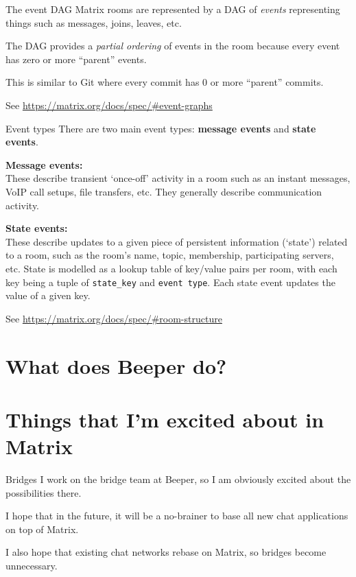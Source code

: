 \documentclass{acm}
\begin{document}
\begin{frame}{The event DAG}
    Matrix rooms are represented by a DAG of \textit{events} representing things
    such as messages, joins, leaves, etc.
    \pause

    The DAG provides a \textit{partial ordering} of events in the room because
    every event has zero or more ``parent'' events.
    \pause

    This is similar to Git where every commit has 0 or more ``parent'' commits.

    \vspace{1cm}
    {
        \tiny
        See \url{https://matrix.org/docs/spec/\#event-graphs}
    }
\end{frame}

\begin{frame}{Event types}
    There are two main event types: \textbf{message events} and \textbf{state
    events}.
    \pause

    \textbf{Message events:} \\
    These describe transient `once-off' activity in a room such as an instant
    messages, VoIP call setups, file transfers, etc. They generally describe
    communication activity.
    \pause

    \textbf{State events:} \\
    These describe updates to a given piece of persistent information (`state')
    related to a room, such as the room's name, topic, membership, participating
    servers, etc. State is modelled as a lookup table of key/value pairs per
    room, with each key being a tuple of \texttt{state\_key} and \texttt{event
    type}. Each state event updates the value of a given key.

    {
        \tiny
        See \url{https://matrix.org/docs/spec/\#room-structure}
    }
\end{frame}

\section{What does Beeper do?}


\section{Things that I'm excited about in Matrix}

\begin{frame}{Bridges}
    I work on the bridge team at Beeper, so I am obviously excited about the
    possibilities there.
    \pause

    I hope that in the future, it will be a no-brainer to base all new chat
    applications on top of Matrix.

    I also hope that existing chat networks rebase on Matrix, so bridges become
    unnecessary.
\end{frame}
\end{document}
